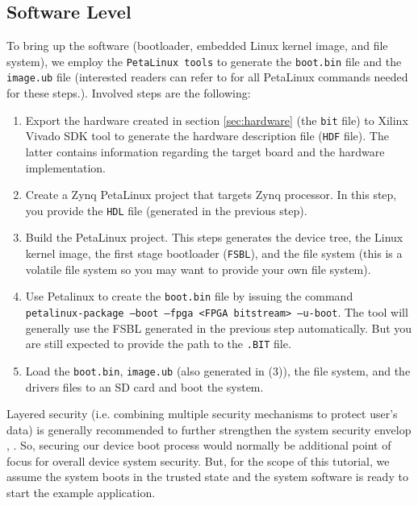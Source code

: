\documentclass[sigconf]{acmart}
\theoremstyle{plain}
\theoremstyle{remark}
\begin{document}
\subsection{Software Level}
To bring up the software (bootloader, embedded Linux kernel image, and file system), we employ the \texttt{PetaLinux tools} to generate the \texttt{boot.bin} file and the \texttt{image.ub} file (interested readers can refer to \cite{petalinux} for all PetaLinux commands needed for these steps.). Involved steps are the following:

\begin{enumerate}
\item Export the hardware created in section \ref{sec:hardware} (the \texttt{bit} file) to Xilinx Vivado SDK tool to generate the hardware description file (\texttt{HDF} file). The latter contains information regarding the target board and the hardware implementation.

\item Create a Zynq PetaLinux project that targets Zynq processor. In this step, you provide the \texttt{HDL} file (generated in the previous step).

\item Build the PetaLinux project. This steps generates the device tree, the Linux kernel image, the first stage bootloader (\texttt{FSBL}), and the file system (this is a volatile file system so you may want to provide your own file system).

\item Use Petalinux to create the \texttt{boot.bin} file by issuing the command \texttt{petalinux-package --boot --fpga <FPGA bitstream> --u-boot}. The tool will generally use the FSBL generated in the previous step automatically. But you are still expected to provide the path to the \texttt{.BIT} file.

\item Load the \texttt{boot.bin}, \texttt{image.ub} (also generated in (3)), the file system, and the drivers files to an SD card and boot the system.
\end{enumerate}

Layered security (i.e. combining multiple security mechanisms to protect user's data) is generally recommended to further strengthen the system security envelop \cite{referencem}, \cite{secpoliciies}. So, securing our device boot process would normally be additional point of focus for overall device system security. But, for the scope of this tutorial, we assume the system boots in the trusted state and the system software is ready to start the example application.
\end{document}
